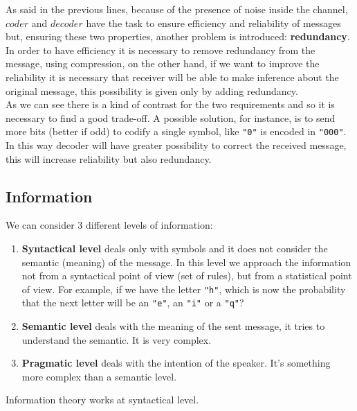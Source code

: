 As said in the previous lines, because of the presence of noise inside the channel, $coder$ and $decoder$ have the task to ensure efficiency and reliability of messages but, ensuring these two properties, another problem is introduced: \textbf{redundancy}.\\
In order to have efficiency it is necessary to remove redundancy from the message, using compression, on the other hand, if we want to improve the reliability it is necessary that receiver will be able to make inference about the original message, this possibility is given only by adding redundancy.\\
As we can see there is a kind of contrast for the two requirements and so it is necessary to find a good trade-off. A possible solution, for instance, is to send more bits (better if odd) to codify a single symbol, like \verb|"0"| is encoded in \verb|"000"|. In this way decoder will have greater possibility to correct the received message, this will increase reliability but also redundancy.

\subsection{Information}
We can consider 3 different levels of information:
\begin{enumerate}
	\item \textbf{Syntactical level} deals only with symbols and it does not consider the semantic (meaning) of the message. In this level we approach the information not from a syntactical point of view (set of rules), but from a statistical point of view. For example, if we have the letter \verb|"h"|, which is now the probability that the next letter will be an \verb|"e"|, an \verb|"i"| or a \verb|"q"|?
	\item \textbf{Semantic level} deals with the meaning of the sent message, it tries to understand the semantic. It is very complex.
	\item \textbf{Pragmatic level} deals with the intention of the speaker. It's something more complex than a semantic level.
\end{enumerate}
Information theory works at syntactical level.
\par \bigskip \noindent

